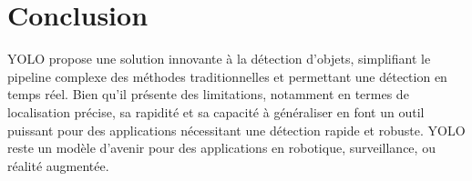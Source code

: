 \documentclass[a4paper,11pt]{article}
\begin{document}
\section{Conclusion}
YOLO propose une solution innovante à la détection d'objets, simplifiant le pipeline complexe des méthodes traditionnelles et permettant une détection en temps réel. Bien qu'il présente des limitations, notamment en termes de localisation précise, sa rapidité et sa capacité à généraliser en font un outil puissant pour des applications nécessitant une détection rapide et robuste. YOLO reste un modèle d'avenir pour des applications en robotique, surveillance, ou réalité augmentée.
\end{document}
